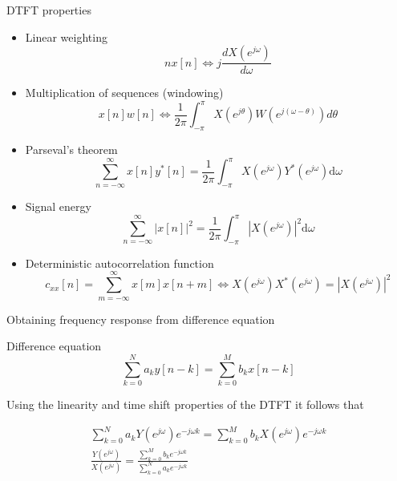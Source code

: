 \documentclass{beamer}
\begin{document}
%
\begin{frame}{DTFT properties}
\begin{itemize}
	\item Linear weighting
	\begin{equation*}
	nx[n] \Longleftrightarrow j\frac{dX(e^{j\omega})}{d\omega}
	\end{equation*}
	\item Multiplication of sequences (windowing)
	\begin{equation*}
	x[n]w[n] \Longleftrightarrow \frac{1}{2\pi}\int_{-\pi}^{\pi}X(e^{j\theta})W(e^{j(\omega-\theta)}){d\theta}
	\end{equation*}
	\item Parseval's theorem
	\begin{equation*}
	\sum_{n=-\infty}^{\infty}x[n]y^*[n] = \frac{1}{2\pi}\int_{-\pi}^{\pi}X(e^{j\omega})Y^*(e^{j\omega})\mathrm{d}\omega
	\end{equation*}
	\item Signal energy
	\begin{equation*}
	\sum_{n=-\infty}^{\infty}|x[n]|^2 = \frac{1}{2\pi}\int_{-\pi}^{\pi}|X(e^{j\omega})|^2\mathrm{d}\omega
	\end{equation*}	
	\item Deterministic autocorrelation function
	\begin{equation*}
	c_{xx}[n] = \sum_{m=-\infty}^{\infty}x[m]x[n+m] \Longleftrightarrow X(e^{j\omega})X^*(e^{j\omega}) = |X(e^{j\omega})|^2
	\end{equation*}	
\end{itemize}
\end{frame}

\begin{frame}{Obtaining frequency response from difference equation}

\begin{block}{Difference equation}
\begin{equation*}
\sum_{k=0}^N a_k y[n-k] = \sum_{k=0}^Mb_k x[n-k]
\end{equation*}
\end{block}

Using the linearity and time shift properties of the DTFT it follows that

\begin{align*}
\sum_{k=0}^N a_kY(e^{j\omega})e^{-j\omega k} = \sum_{k=0}^M b_kX(e^{j\omega})e^{-j\omega k} \\
\frac{Y(e^{j\omega})}{X(e^{j\omega})} = \frac{\sum_{k=0}^M b_ke^{-j\omega k}}{\sum_{k=0}^N a_ke^{-j\omega k}}
\end{align*}

\end{frame}
\end{document}
